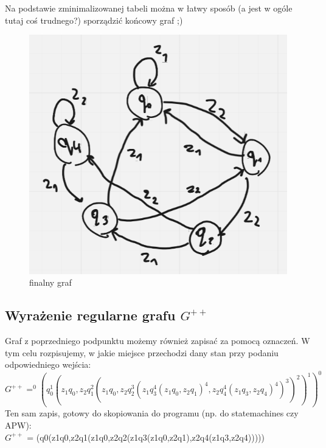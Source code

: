 Na podstawie zminimalizowanej tabeli można w łatwy sposób (a jest w ogóle tutaj coś trudnego?) sporządzić końcowy graf ;)

\begin{figure}[h!]
    \centering
    \includegraphics[width=.45\textwidth]{images/regex/reg_g.png}
    \caption{finalny graf}
    \label{fig:my_label}
\end{figure}

\subsection{Wyrażenie regularne grafu $G^{++}$}

Graf z poprzedniego podpunktu możemy również zapisać za pomocą oznaczeń. W tym celu rozpisujemy, w jakie miejsce przechodzi dany stan przy podaniu odpowiedniego wejścia:\\

$G^{++} = ^0(q_0^1(z_1q_0,z_2q_1^2(z_1q_0,z_2q_2^3(z_1q_3^4(z_1q_0,z_2q_1)^4,z_2q_4^4(z_1q_3,z_2q_4)^4)^3)^2)^1)^0$\\

Ten sam zapis, gotowy do skopiowania do programu (np. do statemachines czy APW):\\
$G^{++}$ = (q0(z1q0,z2q1(z1q0,z2q2(z1q3(z1q0,z2q1),z2q4(z1q3,z2q4)))))